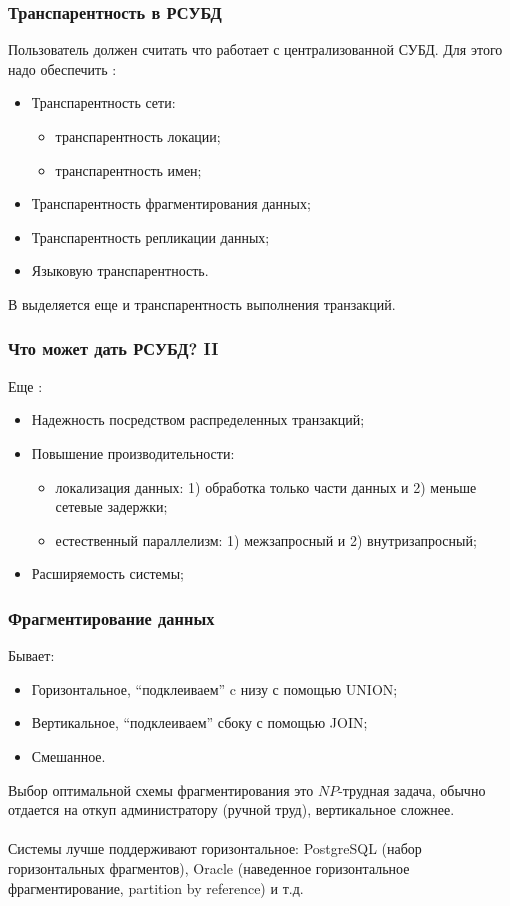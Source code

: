 \documentclass{beamer}
\begin{document}
\begin{frame}
\frametitle{Транспарентность в РСУБД}

Пользователь должен считать что работает с централизованной СУБД. Для этого надо обеспечить \cite{Ozsu2011}:
\begin{itemize}
  \item Транспарентность сети: 
  \begin{itemize}
    \item транспарентность локации;
    \item транспарентность имен;
  \end{itemize}
  \item Транспарентность фрагментирования данных;
  \item Транспарентность репликации данных;
  \item Языковую транспарентность.
\end{itemize}

В \cite{Kian-Lee2009} выделяется еще и транспарентность выполнения транзакций.

\end{frame}


\begin{frame}
\frametitle{Что может дать РСУБД? II}

Еще \cite{Ozsu2011}:
\begin{itemize}
  \setlength\itemsep{1em}
  \item Надежность посредством распределенных транзакций;
  \item Повышение производительности:
  \begin{itemize}
    \item локализация данных: 1) обработка только части данных и 2) меньше сетевые задержки;
    \item естественный параллелизм: 1) межзапросный и 2) внутризапросный;
  \end{itemize}
  \item Расширяемость системы;
  
\end{itemize}
\end{frame}

\begin{frame}
\frametitle{Фрагментирование данных}

Бывает:
\begin{itemize}
  \setlength\itemsep{1em}
  \item Горизонтальное, ``подклеиваем'' c низу с помощью UNION;
  \item Вертикальное, ``подклеиваем'' сбоку с помощью JOIN;
  \item Смешанное.
\end{itemize}

Выбор оптимальной схемы фрагментирования это $NP$-трудная задача, обычно отдается на откуп администратору (ручной труд), вертикальное сложнее.\\~\\

Системы лучше поддерживают горизонтальное: PostgreSQL (набор горизонтальных фрагментов), Oracle (наведенное горизонтальное фрагментирование, partition by reference) и т.д.
\end{frame}
\end{document}
